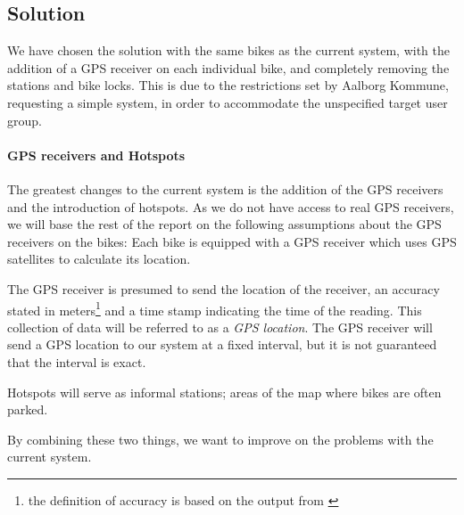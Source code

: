 \subsection{Solution} \label{prob_statement:solution}
We have chosen the solution with the same bikes as the current system, with the addition of a GPS receiver on each individual bike, and completely removing the stations and bike locks.
This is due to the restrictions set by Aalborg Kommune, requesting a simple system, in order to accommodate the unspecified target user group.


\paragraph{GPS receivers and Hotspots}\label{gpsreceiver}
The greatest changes to the current system is the addition of the GPS receivers and the introduction of hotspots.
As we do not have access to real GPS receivers, we will base the rest of the report on the following assumptions about the GPS receivers on the bikes:
Each bike is equipped with a GPS receiver which uses GPS satellites to calculate its location.

The GPS receiver is presumed to send the location of the receiver, an accuracy stated in meters\footnote{the definition of accuracy is based on the output from \citet{followmee}} and a time stamp indicating the time of the reading.
This collection of data will be referred to as a \emph{GPS location}.
The GPS receiver will send a GPS location to our system at a fixed interval, but it is not guaranteed that the interval is exact.

Hotspots will serve as informal stations; areas of the map where bikes are often parked.

By combining these two things, we want to improve on the problems with the current system.

